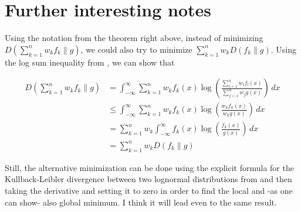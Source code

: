 \documentclass{article}
\begin{document}
\section{Further interesting notes}

Using the notation from the theorem right above, instead of minimizing $D\left(\sum_{k=1}^{n}{w_{k}f_{k}} \parallel g\right)$, we could also try to minimize $\sum_{k = 1}^{n}w_{k}D(f_{k} \parallel g)$. Using the log sum inequality from \cite{log-sum-inequality}, we can show that 

\begin{align}
    D\left(\sum_{k=1}^{n}{w_{k}f_{k}} \parallel g\right) &= \int _{-\infty }^{\infty }\sum_{k=1}^{n}{w_{k}f_{k}(x)}\log \left({\frac {\sum_{l=1}^{n}{w_{l}f_{l}(x)}}{\sum_{j=1}^{n}{w_{j}g(x)}}}\right)\,dx \\
    &\leq \int _{-\infty }^{\infty }\sum_{k=1}^{n}{w_{k}f_{k}(x)}\log \left({\frac {{w_{k}f_{k}(x)}}{{w_{k}g(x)}}}\right)\,dx \\
    &= \sum_{k=1}^{n}{w_{k}\int _{-\infty }^{\infty }f_{k}(x)}\log \left({\frac {{f_{k}(x)}}{{g(x)}}}\right)\,dx \\
    &= \sum_{k = 1}^{n}w_{k}D(f_{k} \parallel g)
\end{align}

Still, the alternative minimization can be done using the explicit formula for the Kullback-Leibler divergence between two lognormal distributions from \cite{k-l-div-between-two-lognormals} and then taking the derivative and setting it to zero in order to find the local and -as one can show- also global minimum. I think it will lead even to the same result. 

\printbibliography
\end{document}

